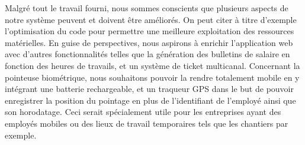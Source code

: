 Malgré tout le travail fourni, nous sommes conscients que plusieurs aspects de
notre système peuvent et doivent être améliorés. On peut citer à titre d'exemple
l'optimisation du code pour permettre une meilleure exploitation des ressources
matérielles. En guise de perspectives, nous aspirons à enrichir l'application
web avec d'autres fonctionnalités telles que la génération des bulletins de
salaire en fonction des heures de travails, et un système de ticket multicanal.
Concernant la pointeuse biométrique, nous souhaitons pouvoir la rendre
totalement mobile en y intégrant une batterie rechargeable, et un traqueur GPS
dans le but de pouvoir enregistrer la position du pointage en plus de
l'identifiant de l'employé ainsi que son horodatage. Ceci serait spécialement
utile pour les entreprises ayant des employés mobiles ou des lieux de travail
temporaires tels que les chantiers par exemple.  
